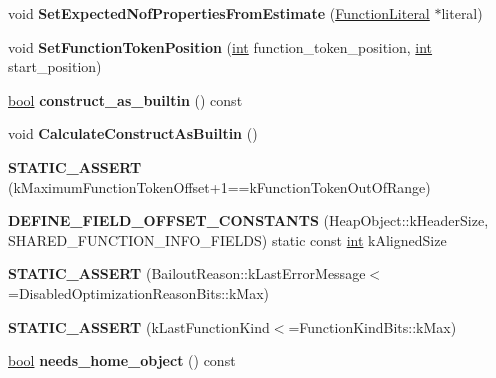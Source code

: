 \begin{DoxyCompactItemize}
void {\bfseries Set\+Expected\+Nof\+Properties\+From\+Estimate} (\mbox{\hyperlink{classv8_1_1internal_1_1FunctionLiteral}{Function\+Literal}} $\ast$literal)
\item 
\mbox{\label{classv8_1_1internal_1_1SharedFunctionInfo_a112f5d828c9ca7bcbf28ce9817d27722}} 
void {\bfseries Set\+Function\+Token\+Position} (\mbox{\hyperlink{classint}{int}} function\+\_\+token\+\_\+position, \mbox{\hyperlink{classint}{int}} start\+\_\+position)
\item 
\mbox{\label{classv8_1_1internal_1_1SharedFunctionInfo_a7d1360bac7638d79ac026b19502fae08}} 
\mbox{\hyperlink{classbool}{bool}} {\bfseries construct\+\_\+as\+\_\+builtin} () const
\item 
\mbox{\label{classv8_1_1internal_1_1SharedFunctionInfo_adc7549d98cf761ca9d12f3d0958470ed}} 
void {\bfseries Calculate\+Construct\+As\+Builtin} ()
\item 
\mbox{\label{classv8_1_1internal_1_1SharedFunctionInfo_ae2735d26112a61850c302fd2aadf7cde}} 
{\bfseries S\+T\+A\+T\+I\+C\+\_\+\+A\+S\+S\+E\+RT} (k\+Maximum\+Function\+Token\+Offset+1==k\+Function\+Token\+Out\+Of\+Range)
\item 
\mbox{\label{classv8_1_1internal_1_1SharedFunctionInfo_a6b123c5f5077b7d6e275efb9d0909013}} 
{\bfseries D\+E\+F\+I\+N\+E\+\_\+\+F\+I\+E\+L\+D\+\_\+\+O\+F\+F\+S\+E\+T\+\_\+\+C\+O\+N\+S\+T\+A\+N\+TS} (Heap\+Object\+::k\+Header\+Size, S\+H\+A\+R\+E\+D\+\_\+\+F\+U\+N\+C\+T\+I\+O\+N\+\_\+\+I\+N\+F\+O\+\_\+\+F\+I\+E\+L\+DS) static const \mbox{\hyperlink{classint}{int}} k\+Aligned\+Size
\item 
\mbox{\label{classv8_1_1internal_1_1SharedFunctionInfo_a4ee7d9b00b997c42dda0873301df1e86}} 
{\bfseries S\+T\+A\+T\+I\+C\+\_\+\+A\+S\+S\+E\+RT} (Bailout\+Reason\+::k\+Last\+Error\+Message$<$=Disabled\+Optimization\+Reason\+Bits\+::k\+Max)
\item 
\mbox{\label{classv8_1_1internal_1_1SharedFunctionInfo_af5c28099341aba2714a07f71848b8281}} 
{\bfseries S\+T\+A\+T\+I\+C\+\_\+\+A\+S\+S\+E\+RT} (k\+Last\+Function\+Kind$<$=Function\+Kind\+Bits\+::k\+Max)
\item 
\mbox{\label{classv8_1_1internal_1_1SharedFunctionInfo_a412cd6ecec557248c20d8aa4ec372994}} 
\mbox{\hyperlink{classbool}{bool}} {\bfseries needs\+\_\+home\+\_\+object} () const
\end{DoxyCompactItemize}
